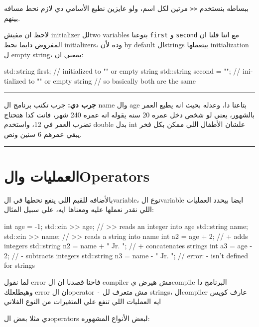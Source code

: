 \documentclass[11pt]{article}
\let\OriginalVerbatim\verbatim
\let\endOriginalVerbatim\endverbatim
\renewenvironment{verbatim}{\begin{english}\OriginalVerbatim}{\endOriginalVerbatim\end{english}}
\begin{document}
ببساطه بنستخدم \texttt{<{}<{}} مرتين لكل اسم، ولو عايزين نطبع الأسامي دي لازم نحط مسافه بينهم.

لاحظ ان مفيش initializer للtwo variables بتوعنا \texttt{first} و \texttt{second} مع اننا قلنا ان المفروض دايما نحط initializers، وده لأن by default الstrings بيتعملها initialization ل empty string، بمعني ان:

\begin{verbatim}
std::string first;	      // initialized to "" or empty string
std::string second = "";  // initialized to "" or empty string
// so basically both are the same
\end{verbatim}

\noindent\rule{\textwidth}{0.5pt}
 \textbf{جرب دي:}
جرب تكتب برنامج ال name وال age بتاعنا دا، وعدله بحيث انه يطبع العمر بالشهور، يعني لو شخص دخل عمره 20 سنه يقوله انه عمره 240 شهر، فانت كدا هتحتاج تضرب العمر في 12، واستخدم double بدل int علشان الأطفال اللي ممكن بكل فخر يبقي عمرهم 6 سنين ونص.

\noindent\rule{\textwidth}{0.5pt}
\section{العمليات والOperators}
\label{sec:org6bc2688}
بالأضافه للقيم اللي ينفع نحطها في الvariable، نوع الvariable ايضا بيحدد العمليات اللي نقدر نعملها عليه ومعناها ايه، علي سبيل المثال:

\begin{verbatim}
int age = -1;
std::cin >> age;                  // >> reads an integer into age
std::string name;
std::cin >> name;                 // >> reads a string into name
int a2 = age + 2;            // + adds integers
std::string n2 = name + " Jr. ";  // + concatenates strings
int a3 = age - 2;            // - subtracts integers
std::string n3 = name - " Jr. ";  // error: - isn’t defined for strings
\end{verbatim}

لما نقول error فاحنا قصدنا ان ال compiler مش هيرض يcompile البرنامج دا وهيطلعلك error ان الoperator \texttt{-} مش متعرف لل strings، الcompiler عارف كويس ايه العمليات اللي تنفع علي المتغيرات من النوع الفلاني

دي مثلا بعض الoperators لبعض الأنواع المشهوره:
\end{document}
